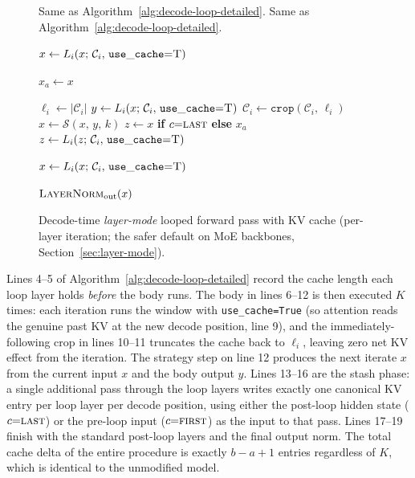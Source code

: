 \begin{figure}[t]
\centering
\begin{algorithm}[H]
\caption{Decode-time \emph{layer-mode} looped forward pass with KV cache (per-layer iteration; the safer default on MoE backbones, Section~\ref{sec:layer-mode}).}
\label{alg:decode-loop-layer-detailed}
\begin{algorithmic}[1]
\Require Same as Algorithm~\ref{alg:decode-loop-detailed}.
\Ensure Same as Algorithm~\ref{alg:decode-loop-detailed}.

 
    \State $x \gets L_i(x;\,\mathcal{C}_i,\,\mathtt{use\_cache}{=}\textsc{T})$
\EndFor

\State $x_a \gets x$

 
    \State $\ell_i \gets |\mathcal{C}_i|$ 
     
        \State $y \gets L_i(x;\,\mathcal{C}_i,\,\mathtt{use\_cache}{=}\textsc{T})$
        \State $\mathcal{C}_i \gets \mathtt{crop}(\mathcal{C}_i,\,\ell_i)$
        \State $x \gets \mathcal{S}(x,\,y,\,k)$
    \EndFor
    \State $z \gets x$ \textbf{if} $c{=}\textsc{last}$ \textbf{else} $x_a$
        \State $z \gets L_i(z;\,\mathcal{C}_i,\,\mathtt{use\_cache}{=}\textsc{T})$
    \EndIf
\EndFor

 
    \State $x \gets L_i(x;\,\mathcal{C}_i,\,\mathtt{use\_cache}{=}\textsc{T})$
\EndFor

\State \Return $\textsc{LayerNorm}_{\text{out}}(x)$
\end{algorithmic}
\end{algorithm}
\end{figure}

Lines 4--5 of Algorithm~\ref{alg:decode-loop-detailed} record the cache length each loop layer holds \emph{before} the body runs. The body in lines 6--12 is then executed $K$ times: each iteration runs the window with \texttt{use\_cache=True} (so attention reads the genuine past KV at the new decode position, line 9), and the immediately-following crop in lines 10--11 truncates the cache back to $\ell_i$, leaving zero net KV effect from the iteration. The strategy step on line 12 produces the next iterate $x$ from the current input $x$ and the body output $y$. Lines 13--16 are the stash phase: a single additional pass through the loop layers writes exactly one canonical KV entry per loop layer per decode position, using either the post-loop hidden state ($c{=}\textsc{last}$) or the pre-loop input ($c{=}\textsc{first}$) as the input to that pass. Lines 17--19 finish with the standard post-loop layers and the final output norm. The total cache delta of the entire procedure is exactly $b - a + 1$ entries regardless of $K$, which is identical to the unmodified model.

